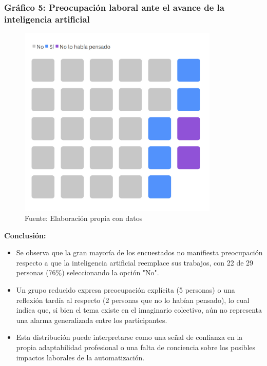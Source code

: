 \documentclass[12pt, a4paper]{article}
\begin{document}
\subsubsection*{Gráfico 5: Preocupación laboral ante el avance de la inteligencia artificial}
\begin{figure}[H]
    \centering
    \includegraphics[width=0.85\textwidth]{Graficos/PreocupacionLaboral.jpg}
    \caption[5]{Fuente: Elaboración propia con datos}
\end{figure}

\textbf{Conclusión:}  
\begin{itemize}
    \item Se observa que la gran mayoría de los encuestados no manifiesta preocupación respecto a que la inteligencia artificial reemplace sus trabajos, con 22 de 29 personas (76\%) seleccionando la opción "No".
    \item Un grupo reducido expresa preocupación explícita (5 personas) o una reflexión tardía al respecto (2 personas que no lo habían pensado), lo cual indica que, si bien el tema existe en el imaginario colectivo, aún no representa una alarma generalizada entre los participantes.
    \item Esta distribución puede interpretarse como una señal de confianza en la propia adaptabilidad profesional o una falta de conciencia sobre los posibles impactos laborales de la automatización.
\end{itemize}
\end{document}
